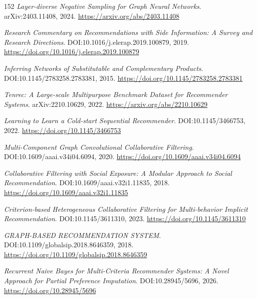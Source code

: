 \documentclass[11pt,a4paper]{article}
\begin{document}
\begin{thebibliography}{152}
\newblock \emph{Layer-diverse Negative Sampling for Graph Neural Networks}.
\newblock arXiv:2403.11408, 2024.
\newblock \url{https://arxiv.org/abs/2403.11408}

\newblock \emph{Research Commentary on Recommendations with Side Information: A Survey and Research Directions}.
\newblock DOI:10.1016/j.elerap.2019.100879, 2019.
\newblock \url{https://doi.org/10.1016/j.elerap.2019.100879}

\newblock \emph{Inferring Networks of Substitutable and Complementary Products}.
\newblock DOI:10.1145/2783258.2783381, 2015.
\newblock \url{https://doi.org/10.1145/2783258.2783381}

\newblock \emph{Tenrec: A Large-scale Multipurpose Benchmark Dataset for Recommender Systems}.
\newblock arXiv:2210.10629, 2022.
\newblock \url{https://arxiv.org/abs/2210.10629}

\newblock \emph{Learning to Learn a Cold-start Sequential Recommender}.
\newblock DOI:10.1145/3466753, 2022.
\newblock \url{https://doi.org/10.1145/3466753}

\newblock \emph{Multi-Component Graph Convolutional Collaborative Filtering}.
\newblock DOI:10.1609/aaai.v34i04.6094, 2020.
\newblock \url{https://doi.org/10.1609/aaai.v34i04.6094}

\newblock \emph{Collaborative Filtering with Social Exposure: A Modular Approach to Social Recommendation}.
\newblock DOI:10.1609/aaai.v32i1.11835, 2018.
\newblock \url{https://doi.org/10.1609/aaai.v32i1.11835}

\newblock \emph{Criterion-based Heterogeneous Collaborative Filtering for Multi-behavior Implicit Recommendation}.
\newblock DOI:10.1145/3611310, 2023.
\newblock \url{https://doi.org/10.1145/3611310}

\newblock \emph{GRAPH-BASED RECOMMENDATION SYSTEM}.
\newblock DOI:10.1109/globalsip.2018.8646359, 2018.
\newblock \url{https://doi.org/10.1109/globalsip.2018.8646359}

\newblock \emph{Recurrent Naive Bayes for Multi-Criteria Recommender Systems: A Novel Approach for Partial Preference Imputation}.
\newblock DOI:10.28945/5696, 2026.
\newblock \url{https://doi.org/10.28945/5696}


\end{thebibliography}
\end{document}

